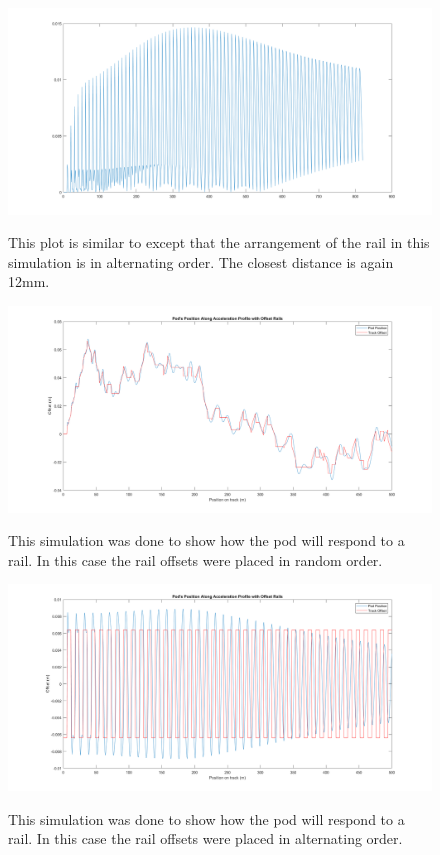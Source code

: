 \documentclass[main.tex]{subfiles}
\begin{document}
    \begin{figure}
        	\centering
        \includegraphics[width=\linewidth]{images/OscillatingMaxDistToRail}
        \label{fig:OMaxDistRail}
        \caption{This plot is similar to  except that the arrangement of the rail in this simulation is in alternating order. The closest distance is again 12mm.}
    \end{figure}
    \begin{figure}[H]
    	\centering
        \includegraphics[width=\linewidth]{images/RandPodLateralResponse}
        \label{fig:RandpodLateralResponse}
        \caption{This simulation was done to show how the pod will respond to a rail. In this case the rail offsets were placed in random order.}
    \end{figure}
    \begin{figure}[H]
    	\centering
        \includegraphics[width=\linewidth]{images/OscillatingPodLateralResponse}
        \label{fig:OPodLateralRespnse}
        \caption{This simulation was done to show how the pod will respond to a rail. In this case the rail offsets were placed in alternating order.}
    \end{figure}
    
\end{document}
